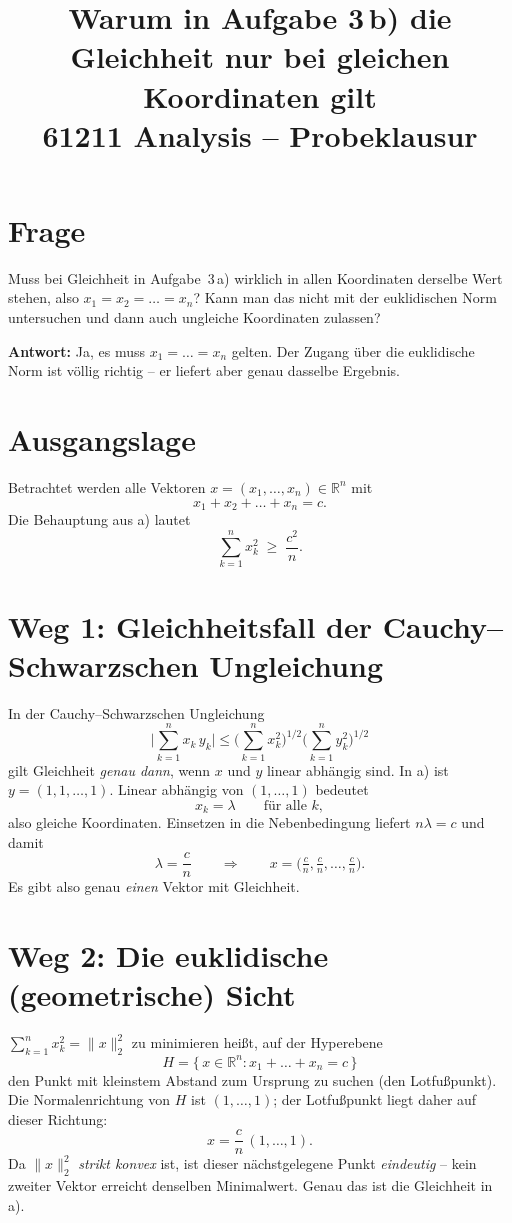 \documentclass[a4paper,12pt]{article}
\title{Warum in Aufgabe 3\,b) die Gleichheit nur bei gleichen Koordinaten gilt\\[0.4em]
\large 61211 Analysis -- Probeklausur}
\author{}
\date{}
\begin{document}
\maketitle

\section*{Frage}
Muss bei Gleichheit in Aufgabe~3\,a) wirklich in allen Koordinaten derselbe Wert stehen,
also $x_1=x_2=\dots=x_n$? Kann man das nicht mit der euklidischen Norm untersuchen und
dann auch ungleiche Koordinaten zulassen?

\textbf{Antwort:} Ja, es muss $x_1=\dots=x_n$ gelten. Der Zugang über die euklidische Norm
ist völlig richtig -- er liefert aber genau dasselbe Ergebnis.

\section*{Ausgangslage}
Betrachtet werden alle Vektoren $x=(x_1,\dots,x_n)\in\mathbb{R}^n$ mit
\[
  x_1+x_2+\dots+x_n=c .
\]
Die Behauptung aus a) lautet
\[
  \sum_{k=1}^n x_k^2 \;\ge\; \frac{c^2}{n}.
\]

\section*{Weg 1: Gleichheitsfall der Cauchy--Schwarzschen Ungleichung}
In der Cauchy--Schwarzschen Ungleichung
\[
  \Big|\sum_{k=1}^n x_k\,y_k\Big|\le \Big(\sum_{k=1}^n x_k^2\Big)^{1/2}\Big(\sum_{k=1}^n y_k^2\Big)^{1/2}
\]
gilt Gleichheit \emph{genau dann}, wenn $x$ und $y$ linear abhängig sind. In a) ist
$y=(1,1,\dots,1)$. Linear abhängig von $(1,\dots,1)$ bedeutet
\[
  x_k=\lambda \qquad\text{für alle } k,
\]
also gleiche Koordinaten. Einsetzen in die Nebenbedingung liefert $n\lambda=c$ und damit
\[
  \lambda=\frac{c}{n}
  \qquad\Longrightarrow\qquad
  x=\Big(\tfrac{c}{n},\tfrac{c}{n},\dots,\tfrac{c}{n}\Big).
\]
Es gibt also genau \emph{einen} Vektor mit Gleichheit.

\section*{Weg 2: Die euklidische (geometrische) Sicht}
$\sum_{k=1}^n x_k^2=\lVert x\rVert_2^2$ zu minimieren heißt, auf der Hyperebene
\[
  H=\{\,x\in\mathbb{R}^n : x_1+\dots+x_n=c\,\}
\]
den Punkt mit kleinstem Abstand zum Ursprung zu suchen (den Lotfußpunkt). Die
Normalenrichtung von $H$ ist $(1,\dots,1)$; der Lotfußpunkt liegt daher auf dieser Richtung:
\[
  x=\frac{c}{n}\,(1,\dots,1).
\]
Da $\lVert x\rVert_2^2$ \emph{strikt konvex} ist, ist dieser nächstgelegene Punkt
\emph{eindeutig} -- kein zweiter Vektor erreicht denselben Minimalwert. Genau das ist die
Gleichheit in a).
\end{document}
